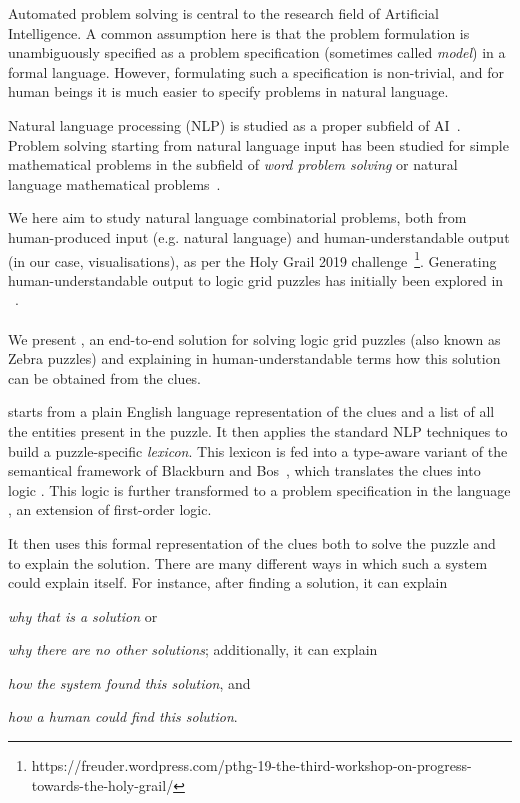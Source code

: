Automated problem solving is central to the research field of Artificial Intelligence. A common assumption here is that the problem formulation is unambiguously specified as a problem specification (sometimes called \textit{model}) in a formal language. However, formulating such a specification is non-trivial, and for human beings it is much easier to specify problems in natural language.

Natural language processing (NLP) is studied as a proper subfield of AI~\cite{manning1999foundations}. Problem solving starting from natural language input has been studied for simple mathematical problems in the subfield of \textit{word problem solving} or natural language mathematical problems~\cite{Mukherjee2008}.

We here aim to study natural language combinatorial problems, both from human-produced input (e.g. natural language) and human-understandable output (in our case, visualisations), as per the Holy Grail 2019 challenge~\footnote{https://freuder.wordpress.com/pthg-19-the-third-workshop-on-progress-towards-the-holy-grail/}. Generating human-understandable output to logic grid puzzles has initially been explored in ~\cite{sqalli1996inference}.

\paragraph{}
We present \ourtool,  an end-to-end solution for solving logic grid puzzles (also known as Zebra puzzles) and explaining in human-understandable terms how this solution can be obtained from the clues. 

\ourtool starts from a plain English language representation of the clues and a list of all the entities present in the puzzle. It then applies the standard NLP techniques to build a puzzle-specific \textit{lexicon}. This lexicon is fed into a type-aware variant of the semantical framework of Blackburn and Bos~\cite{bos}, which translates the clues into logic . This logic is further transformed to a problem specification in the \idp language , an extension of first-order logic. 

It then uses this formal representation of the clues both to solve the puzzle and to explain the solution. 
There are many different ways in which such a system could explain itself. For instance, after finding a solution, it can explain \begin{inparaenum}\item \emph{why that is a solution} or \item \emph{why there are no other solutions}; additionally, it can explain \item \emph{how the system found this solution}, and \item \emph{how a human could find this solution}. \end{inparaenum}
 

